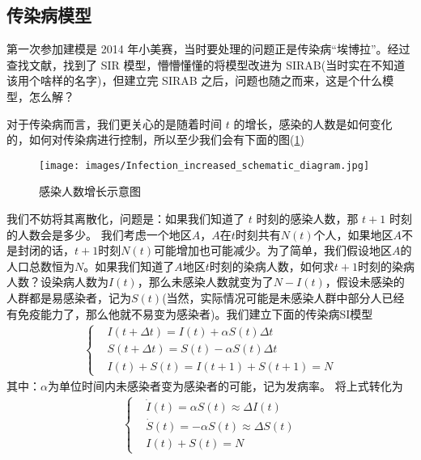 	\subsection{传染病模型}
		\label{sub:sub:de-ode-modeling-sir}
		第一次参加建模是 2014 年小美赛，当时要处理的问题正是传染病“埃博拉”。经过查找文献，找到了 SIR 模型，懵懵懂懂的将模型改进为 SIRAB(当时实在不知道该用个啥样的名字)，但建立完 SIRAB 之后，问题也随之而来，这是个什么模型，怎么解？
		\par
		对于传染病而言，我们更关心的是随着时间 $t$ 的增长，感染的人数是如何变化的，如何对传染病进行控制，所以至少我们会有下面的图(\ref{fig:感染人数增长示意图})
		\begin{figure}[H]
		\centering
		\texttt{[image: images/Infection\_increased\_schematic\_diagram.jpg]}%
		\caption{感染人数增长示意图}
		\label{fig:感染人数增长示意图}
		\end{figure}
		\par
		我们不妨将其离散化，问题是：如果我们知道了 $t$ 时刻的感染人数，那 $t + 1$ 时刻的人数会是多少。
		我们考虑一个地区$A$，$A$在$t$时刻共有$N(t)$个人，如果地区$A$不是封闭的话，$t+1$时刻$N(t)$可能增加也可能减少。为了简单，我们假设地区$A$的人口总数恒为$N$。如果我们知道了$A$地区$t$时刻的染病人数，如何求$t+1$时刻的染病人数？设染病人数为$I(t)$，那么未感染人数就变为了$N-I(t)$，假设未感染的人群都是易感染者，记为$S(t)$(当然，实际情况可能是未感染人群中部分人已经有免疫能力了，那么他就不易变为感染者)。我们建立下面的传染病SI模型
		\begin{align*}
			 \left\{
				 \begin{aligned}
					 &I(t+\Delta t) = I(t) + \alpha S(t) \Delta t\\
					 &S(t+\Delta t) = S(t) - \alpha S(t) \Delta t\\
					 &I(t) + S(t) = I(t+1)+S(t+1) = N
				 \end{aligned}
			 \right.
		\end{align*}
		其中：$\alpha$为单位时间内未感染者变为感染者的可能，记为发病率。
		将上式转化为
		\begin{align*}
			 \left\{
				 \begin{aligned}
					 &\dot{I}(t) = \alpha S(t) \approx \Delta I(t)\\
					 &\dot{S}(t) = - \alpha S(t) \approx \Delta S(t)\\
					 &I(t) + S(t) = N
				 \end{aligned}
			 \right.
		\end{align*}
